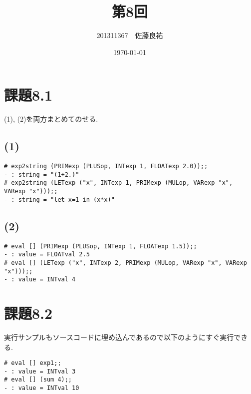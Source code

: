 \documentclass[11pt,a4j]{jarticle}
\title{第8回}
\author{201311367　佐藤良祐}
\date{\today}
\begin{document}
\section*{課題8.1}
(1), (2)を両方まとめてのせる.



\subsection*{(1)}
\begin{lstlisting}
# exp2string (PRIMexp (PLUSop, INTexp 1, FLOATexp 2.0));;
- : string = "(1+2.)"
# exp2string (LETexp ("x", INTexp 1, PRIMexp (MULop, VARexp "x", VARexp "x")));;
- : string = "let x=1 in (x*x)"
\end{lstlisting}
\subsection*{(2)}
\begin{lstlisting}
# eval [] (PRIMexp (PLUSop, INTexp 1, FLOATexp 1.5));;
- : value = FLOATval 2.5
# eval [] (LETexp ("x", INTexp 2, PRIMexp (MULop, VARexp "x", VARexp "x")));;
- : value = INTval 4
\end{lstlisting}
\newpage
\section*{課題8.2}
実行サンプルもソースコードに埋め込んであるので以下のようにすぐ実行できる.

\begin{lstlisting}
# eval [] exp1;;
- : value = INTval 3
# eval [] (sum 4);;
- : value = INTval 10
\end{lstlisting}
\end{document}
